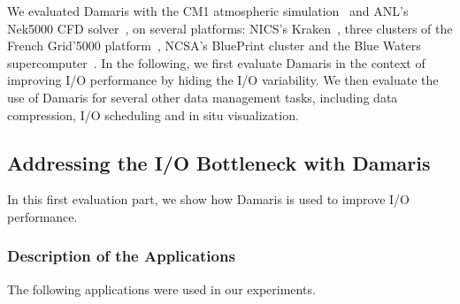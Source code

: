We evaluated Damaris with the CM1 atmospheric simulation~\cite{bryan2002benchmark} and ANL's Nek5000 CFD solver~\cite{nek5000}, 
on several platforms: NICS's Kraken~\cite{kraken}, three clusters of the French Grid'5000 platform~\cite{grid5000}, NCSA's BluePrint cluster
and the Blue Waters supercomputer~\cite{bluewaters}. In the following, we first 
evaluate Damaris in the context of improving I/O performance by hiding the I/O variability.
We then evaluate the use of Damaris for several other data management tasks, including data compression, 
I/O scheduling and in situ visualization.

\subsection{Addressing the I/O Bottleneck with Damaris}\label{sec:expIO}

In this first evaluation part, we show how Damaris is used to improve I/O performance.

\subsubsection{Description of the Applications}

The following applications were used in our experiments.

